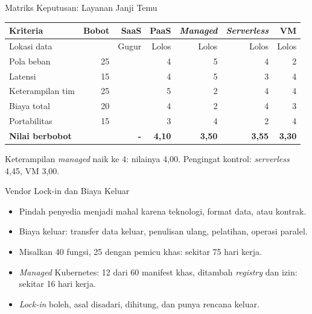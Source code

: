 \documentclass[aspectratio=169, table, 12pt]{beamer}
\begin{document}
\begin{frame}{{\Large Matriks Keputusan: Layanan Janji Temu}}
  \scriptsize
  \begin{tabularx}{\textwidth}{>{\raggedright\arraybackslash}X r r r r r r}
    \hline
    \textbf{Kriteria} & \textbf{Bobot} & \textbf{SaaS} & \textbf{PaaS} &
      \textbf{\textit{Managed}} & \textbf{\textit{Serverless}} & \textbf{VM} \\
    \hline
    Lokasi data & & Gugur & Lolos & Lolos & Lolos & Lolos \\
    \hline
    Pola beban & 25 & & 4 & 5 & 4 & 2 \\
    \hline
    Latensi & 15 & & 4 & 5 & 3 & 4 \\
    \hline
    Keterampilan tim & 25 & & 5 & 2 & 4 & 4 \\
    \hline
    Biaya total & 20 & & 4 & 2 & 4 & 3 \\
    \hline
    Portabilitas & 15 & & 3 & 4 & 2 & 4 \\
    \hline
    \textbf{Nilai berbobot} & & \textbf{-} & \textbf{4,10} & \textbf{3,50} &
      \textbf{3,55} & \textbf{3,30} \\
    \hline
  \end{tabularx}

  \vspace{6pt}
  \small
  Keterampilan \textit{managed} naik ke 4: nilainya 4,00. Pengingat kontrol:
  \textit{serverless} 4,45, VM 3,00.
\end{frame}

\begin{frame}{{\Large Vendor Lock-in dan Biaya Keluar}}
  \vspace{6pt}
  \begin{itemize}
    \item Pindah penyedia menjadi mahal karena teknologi, format data, atau
          kontrak.
    \item Biaya keluar: transfer data keluar, penulisan ulang, pelatihan,
          operasi paralel.
    \item Misalkan 40 fungsi, 25 dengan pemicu khas: sekitar 75 hari kerja.
    \item \textit{Managed} Kubernetes: 12 dari 60 manifest khas, ditambah
          \textit{registry} dan izin: sekitar 16 hari kerja.
    \item \textit{Lock-in} boleh, asal disadari, dihitung, dan punya rencana
          keluar.
  \end{itemize}
\end{frame}
\end{document}
